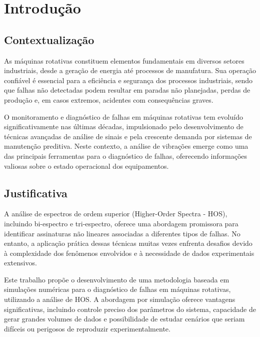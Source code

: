 
\chapter{Introdução}

\section{Contextualização}

As máquinas rotativas constituem elementos fundamentais em diversos setores industriais, desde a geração de energia até processos de manufatura. Sua operação confiável é essencial para a eficiência e segurança dos processos industriais, sendo que falhas não detectadas podem resultar em paradas não planejadas, perdas de produção e, em casos extremos, acidentes com consequências graves.

O monitoramento e diagnóstico de falhas em máquinas rotativas tem evoluído significativamente nas últimas décadas, impulsionado pelo desenvolvimento de técnicas avançadas de análise de sinais e pela crescente demanda por sistemas de manutenção preditiva. Neste contexto, a análise de vibrações emerge como uma das principais ferramentas para o diagnóstico de falhas, oferecendo informações valiosas sobre o estado operacional dos equipamentos.

\section{Justificativa}

A análise de espectros de ordem superior (Higher-Order Spectra - HOS), incluindo bi-espectro e tri-espectro, oferece uma abordagem promissora para identificar assinaturas não lineares associadas a diferentes tipos de falhas. No entanto, a aplicação prática dessas técnicas muitas vezes enfrenta desafios devido à complexidade dos fenômenos envolvidos e à necessidade de dados experimentais extensivos.

Este trabalho propõe o desenvolvimento de uma metodologia baseada em simulações numéricas para o diagnóstico de falhas em máquinas rotativas, utilizando a análise de HOS. A abordagem por simulação oferece vantagens significativas, incluindo controle preciso dos parâmetros do sistema, capacidade de gerar grandes volumes de dados e possibilidade de estudar cenários que seriam difíceis ou perigosos de reproduzir experimentalmente.

